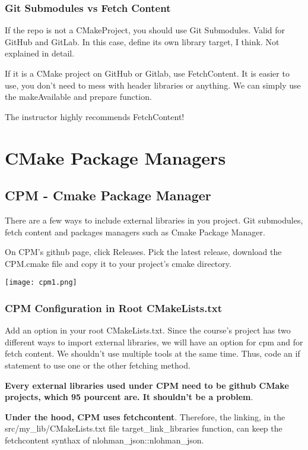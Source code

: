 \subsection{Git Submodules vs Fetch Content}

If the repo is not a CMakeProject, you should use Git Submodules. Valid for GitHub and GitLab. In this case, 
define its own library target, I think. Not explained in detail.

If it is a CMake project on GitHub or Gitlab, use FetchContent. It is easier to use, you don't need to mess with header
libraries or anything. We can simply use the makeAvailable and prepare function.

The instructor highly recommends FetchContent!


\chapter{CMake Package Managers}

\section{CPM - Cmake Package Manager}

There are a few ways to include external libraries in you project. Git submodules, fetch content and packages managers such as
Cmake Package Manager.

On CPM's github page, click Releases. Pick the latest release, download the CPM.cmake file and copy it to your project's
cmake directory.

\begin{center}
    \texttt{[image: cpm1.png]}
\end{center}


\subsection{CPM Configuration in Root CMakeLists.txt}

Add an option in your root CMakeLists.txt.
Since the course's project has two different ways to import external libraries,
we will have an option for cpm and for fetch content.
We shouldn't use multiple tools at the same time. Thus, code
an if statement to use one or the other fetching method.

\textbf{Every external libraries used under CPM need to be github CMake projects, which 95 pourcent are.
It shouldn't be a problem}.


\textbf{Under the hood, CPM uses fetchcontent}. Therefore, the linking,
in the src/my\_lib/CMakeLists.txt file target\_link\_libraries function, 
can keep the fetchcontent synthax of nlohman\_json::nlohman\_json.


